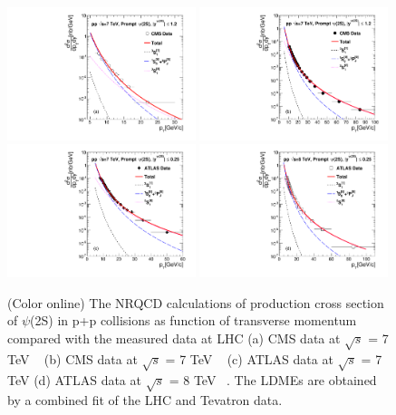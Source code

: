 \documentclass[aps,prc,preprint,superscriptaddress,showpacs,showkeys,amsmath]{revtex4-1}
\begin{document}
\begin{figure}
\includegraphics[width=0.49\textwidth]{Figures/Psi2S/Psi2S_CMS_LowPt.pdf}
\includegraphics[width=0.49\textwidth]{Figures/Psi2S/Psi2S_CMS_HighPt.pdf}
\includegraphics[width=0.49\textwidth]{Figures/Psi2S/Psi2S_ATLAS.pdf}
\includegraphics[width=0.49\textwidth]{Figures/Psi2S/Psi2S_ATLAS_8TeV.pdf}
\caption{(Color online) 
  The NRQCD calculations of production cross section of $\psi$(2S) in p+p collisions 
as function of transverse momentum compared with the measured data at LHC 
 (a) CMS data at $\sqrt{s}$ = 7 TeV ~\cite{Chatrchyan:2011kc} 
 (b) CMS data at $\sqrt{s}$ = 7 TeV ~\cite{Khachatryan:2015rra} 
 (c) ATLAS data at $\sqrt{s}$ = 7 TeV 
 (d) ATLAS data at $\sqrt{s}$ = 8 TeV ~\cite{Aad:2015duc}. 
 The LDMEs are obtained by a combined fit of the LHC and Tevatron data.
}
\label{Fig:LDMEPsi2S}
\end{figure}
\end{document}
